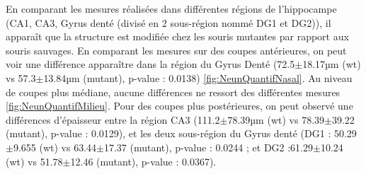 	En comparant les mesures réalisées dans différentes régions de l'hippocampe (CA1, CA3, Gyrus denté (divisé en 2 sous-région nommé DG1 et DG2)), il apparaît que la structure est modifiée chez les souris mutantes par rapport aux souris sauvages. En comparant les mesures sur des coupes antérieures, on peut voir une différence apparaître dans la région du Gyrus Denté (72.5$\pm$18.17µm (\acrshort{wt}) vs 57.3$\pm$13.84µm (mutant), p-value : 0.0138) \cref{fig:NeunQuantifNasal}.  Au niveau de coupes plus médiane, aucune différences ne ressort des différentes mesures \cref{fig:NeunQuantifMilieu}. Pour des coupes plus postérieures, on peut observé une différences d'épaisseur entre la région CA3 (111.2$\pm$78.39µm (\acrshort{wt}) vs 78.39$\pm$39.22 (mutant), p-value : 0.0129), et les deux sous-région du Gyrus denté (DG1 : 50.29$\pm$9.655 (\acrshort{wt}) vs 63.44$\pm$17.37 (mutant), p-value : 0.0244 ; et DG2 :61.29$\pm$10.24 (\acrshort{wt}) vs 51.78$\pm$12.46 (mutant), p-value : 0.0367).
	
